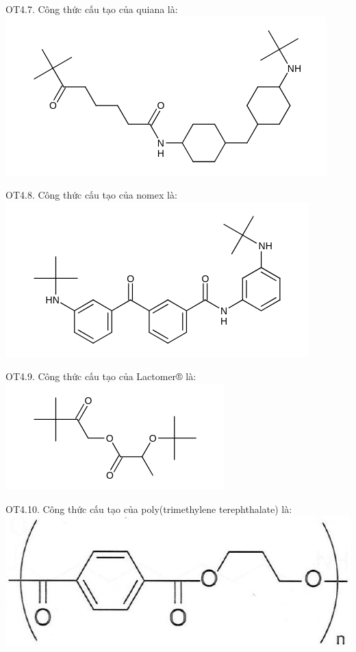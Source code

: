 \documentclass[10pt]{article}
\begin{document}
OT4.7. Công thức cấu tạo của quiana là:\\
\includegraphics{smile-41473da672ac5d7132c57903f8f66c4ef573d36e}

OT4.8. Công thức cấu tạo của nomex là:\\
\includegraphics{smile-51e60fd5bea1138322a44d939bd394f536f15cba}

OT4.9. Công thức cấu tạo của Lactomer® là:\\
\includegraphics{smile-ca1efcc40e41452e319db6fbcf23913b33f06fd0}

OT4.10. Công thức cấu tạo của poly(trimethylene terephthalate) là:\\
\includegraphics[max width=\textwidth, center]{2025_10_23_b4e16b74380d0f7e7700g-071}
\end{document}
